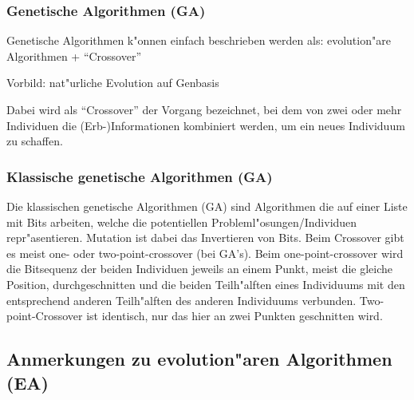 \subsubsection{Genetische Algorithmen (GA)}

Genetische Algorithmen k"onnen einfach beschrieben werden als: evolution"are Algorithmen + ``Crossover''

Vorbild: nat"urliche Evolution auf Genbasis

Dabei wird als ``Crossover'' der Vorgang bezeichnet, bei dem von zwei oder mehr Individuen die (Erb-)Informationen kombiniert werden, um ein neues Individuum zu schaffen.

\subsubsection{Klassische genetische Algorithmen (GA)}

Die klassischen genetische Algorithmen (GA) sind Algorithmen die auf einer Liste mit Bits arbeiten, welche die potentiellen Probleml"osungen/Individuen repr"asentieren. Mutation ist dabei das Invertieren von Bits. Beim Crossover gibt es meist one- oder two-point-crossover (bei GA's). Beim one-point-crossover wird die Bitsequenz der beiden Individuen jeweils an einem Punkt, meist die gleiche Position, durchgeschnitten und die beiden Teilh"alften eines Individuums mit den entsprechend anderen Teilh"alften des anderen Individuums verbunden. Two-point-Crossover ist identisch, nur das hier an zwei Punkten geschnitten wird.




\subsection{Anmerkungen zu evolution"aren Algorithmen (EA)}

